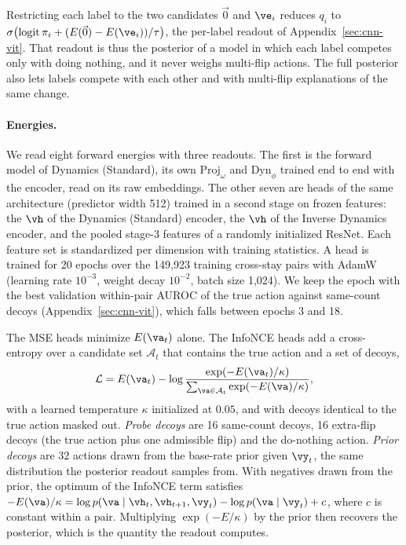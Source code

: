 Restricting each label to the two candidates $\vec 0$ and $\ve_i$ reduces $q_i$ to $\sigma\big(\text{logit}\,\pi_i+(E(\vec 0)-E(\ve_i))/\tau\big)$, the per-label readout of Appendix~\ref{sec:cnn-vit}. That readout is thus the posterior of a model in which each label competes only with doing nothing, and it never weighs multi-flip actions. The full posterior also lets labels compete with each other and with multi-flip explanations of the same change.

\paragraph{Energies.} We read eight forward energies with three readouts. The first is the forward model of Dynamics (Standard), its own $\text{Proj}_\omega$ and $\text{Dyn}_\phi$ trained end to end with the encoder, read on its raw embeddings. The other seven are heads of the same architecture (predictor width 512) trained in a second stage on frozen features: the $\vh$ of the Dynamics (Standard) encoder, the $\vh$ of the Inverse Dynamics encoder, and the pooled stage-3 features of a randomly initialized ResNet. Each feature set is standardized per dimension with training statistics. A head is trained for 20 epochs over the 149{,}923 training cross-stay pairs with AdamW (learning rate $10^{-3}$, weight decay $10^{-2}$, batch size 1{,}024). We keep the epoch with the best validation within-pair AUROC of the true action against same-count decoys (Appendix~\ref{sec:cnn-vit}), which falls between epochs 3 and 18.

The MSE heads minimize $E(\va_t)$ alone. The InfoNCE heads add a cross-entropy over a candidate set $\mathcal{A}_t$ that contains the true action and a set of decoys,
$$ \mathcal{L}=E(\va_t)-\log\frac{\exp(-E(\va_t)/\kappa)}{\sum_{\va\in\mathcal{A}_t}\exp(-E(\va)/\kappa)}, $$
with a learned temperature $\kappa$ initialized at $0.05$, and with decoys identical to the true action masked out. \emph{Probe decoys} are 16 same-count decoys, 16 extra-flip decoys (the true action plus one admissible flip) and the do-nothing action. \emph{Prior decoys} are 32 actions drawn from the base-rate prior given $\vy_t$, the same distribution the posterior readout samples from. With negatives drawn from the prior, the optimum of the InfoNCE term satisfies $-E(\va)/\kappa=\log p(\va\mid\vh_t,\vh_{t+1},\vy_t)-\log p(\va\mid\vy_t)+c$, where $c$ is constant within a pair. Multiplying $\exp(-E/\kappa)$ by the prior then recovers the posterior, which is the quantity the readout computes.

